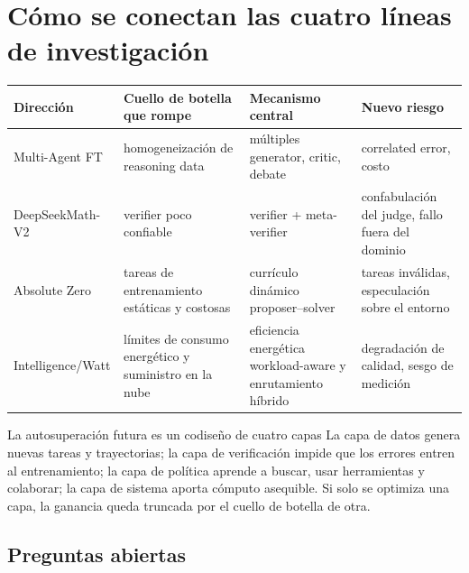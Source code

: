 \section{Cómo se conectan las cuatro líneas de investigación}

\begin{table}[H]
\centering
\small
\begin{tabular}{>{\raggedright\arraybackslash}p{3cm}>{\raggedright\arraybackslash}p{3.4cm}>{\raggedright\arraybackslash}p{3.7cm}>{\raggedright\arraybackslash}p{3.4cm}}
\toprule
\textbf{Dirección} & \textbf{Cuello de botella que rompe} & \textbf{Mecanismo central} & \textbf{Nuevo riesgo} \\
\midrule
Multi-Agent FT & homogeneización de reasoning data & múltiples generator, critic, debate & correlated error, costo \\
DeepSeekMath-V2 & verifier poco confiable & verifier + meta-verifier & confabulación del judge, fallo fuera del dominio \\
Absolute Zero & tareas de entrenamiento estáticas y costosas & currículo dinámico proposer--solver & tareas inválidas, especulación sobre el entorno \\
Intelligence/Watt & límites de consumo energético y suministro en la nube & eficiencia energética workload-aware y enrutamiento híbrido & degradación de calidad, sesgo de medición \\
\bottomrule
\end{tabular}
\end{table}

\begin{importantbox}{La autosuperación futura es un codiseño de cuatro capas}
La capa de datos genera nuevas tareas y trayectorias; la capa de verificación impide que los errores entren al entrenamiento; la capa de política aprende a buscar, usar herramientas y colaborar; la capa de sistema aporta cómputo asequible. Si solo se optimiza una capa, la ganancia queda truncada por el cuello de botella de otra.
\end{importantbox}

\subsection{Preguntas abiertas}

